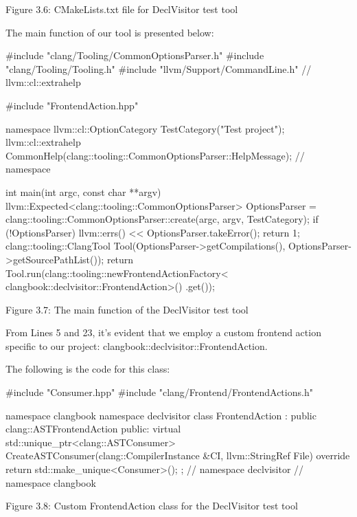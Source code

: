 \begin{center}
Figure 3.6: CMakeLists.txt file for DeclVisitor test tool
\end{center}

The main function of our tool is presented below:

\begin{cpp}
#include "clang/Tooling/CommonOptionsParser.h"
#include "clang/Tooling/Tooling.h"
#include "llvm/Support/CommandLine.h" // llvm::cl::extrahelp

#include "FrontendAction.hpp"

namespace {
  llvm::cl::OptionCategory TestCategory("Test project");
  llvm::cl::extrahelp
    CommonHelp(clang::tooling::CommonOptionsParser::HelpMessage);
} // namespace

int main(int argc, const char **argv) {
  llvm::Expected<clang::tooling::CommonOptionsParser> OptionsParser =
    clang::tooling::CommonOptionsParser::create(argc, argv, TestCategory);
  if (!OptionsParser) {
    llvm::errs() << OptionsParser.takeError();
    return 1;
  }
  clang::tooling::ClangTool Tool(OptionsParser->getCompilations(),
                                 OptionsParser->getSourcePathList());
  return Tool.run(clang::tooling::newFrontendActionFactory<
                       clangbook::declvisitor::FrontendAction>()
                       .get());
}
\end{cpp}

\begin{center}
Figure 3.7: The main function of the DeclVisitor test tool
\end{center}

From Lines 5 and 23, it's evident that we employ a custom frontend action specific to our project: clangbook::declvisitor::FrontendAction.

The following is the code for this class:

\begin{cpp}
#include "Consumer.hpp"
#include "clang/Frontend/FrontendActions.h"

namespace clangbook {
namespace declvisitor {
class FrontendAction : public clang::ASTFrontendAction {
public:
  virtual std::unique_ptr<clang::ASTConsumer>
  CreateASTConsumer(clang::CompilerInstance &CI,
                    llvm::StringRef File) override {
    return std::make_unique<Consumer>();
  }
};
} // namespace declvisitor
}// namespace clangbook
\end{cpp}

\begin{center}
Figure 3.8: Custom FrontendAction class for the DeclVisitor test tool
\end{center}

